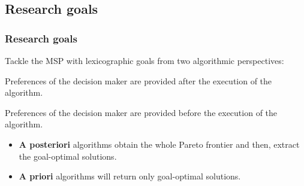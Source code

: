 \subsection{Research goals}
\begin{frame} 
\frametitle{Research goals}
	\large Tackle the MSP with lexicographic goals from two algorithmic perspectives: 
	\vspace{3mm}
	\begin{description}
		\item<2->[A posteriori] Preferences of the decision maker are provided \textcolor{ao}{after} the execution of the algorithm. 
		\vspace{1mm}
		\item<2->[A priori] Preferences of the decision maker are provided \textcolor{ao}{before} the execution of the algorithm.
	\end{description}
	\vspace{4mm}
	\begin{itemize}
		\item<3-> \textbf{A posteriori} algorithms obtain the \textcolor{ao}{whole Pareto frontier} and then, extract the goal-optimal solutions. 
		\vspace{1mm}
		\item<3-> \textbf{A priori} algorithms will return \textcolor{ao}{only goal-optimal} solutions.
	\end{itemize}
\end{frame}

